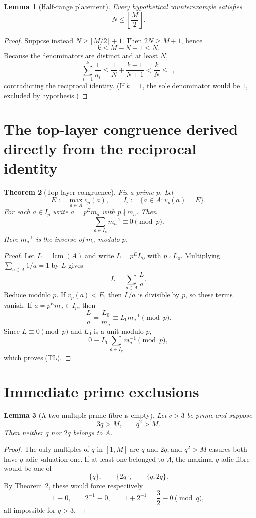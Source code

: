 \documentclass[11pt]{article}
\newtheorem{theorem}{Theorem}[section]
\newtheorem{lemma}[theorem]{Lemma}
\theoremstyle{definition}
\theoremstyle{remark}
\newcommand{\1}{\mathbf 1}
\begin{document}
\begin{lemma}[Half-range placement]\label{lem:half}
Every hypothetical counterexample satisfies
\[
 N\le \left\lfloor\frac M2\right\rfloor.
\]
\end{lemma}
\begin{proof}
Suppose instead $N\ge\lfloor M/2\rfloor+1$.  Then $2N\ge M+1$, hence
\[
 k\le M-N+1\le N.
\]
Because the denominators are distinct and at least $N$,
\[
 \sum_{i=1}^k\frac1{n_i}
 \le \frac1N+\frac{k-1}{N+1}
 < \frac{k}{N}\le1,
\]
contradicting the reciprocal identity.  (If $k=1$, the sole denominator would be $1$, excluded by hypothesis.)
\end{proof}

\section{The top-layer congruence derived directly from the reciprocal identity}

\begin{theorem}[Top-layer congruence]\label{thm:TL}
Fix a prime $p$.  Let
\[
 E:=\max_{a\in A}v_p(a),
 \qquad I_p:=\{a\in A:v_p(a)=E\}.
\]
For each $a\in I_p$ write $a=p^E m_a$ with $p\nmid m_a$.  Then
\[
 \boxed{\sum_{a\in I_p}m_a^{-1}\equiv0\pmod p.}
\tag{TL}
\]
Here $m_a^{-1}$ is the inverse of $m_a$ modulo $p$.
\end{theorem}
\begin{proof}
Let $L=\operatorname{lcm}(A)$ and write $L=p^E L_0$ with $p\nmid L_0$.  Multiplying
$\sum_{a\in A}1/a=1$ by $L$ gives
\[
 L=\sum_{a\in A}\frac La.
\]
Reduce modulo $p$.  If $v_p(a)<E$, then $L/a$ is divisible by $p$, so these terms vanish.  If
$a=p^E m_a\in I_p$, then
\[
 \frac La=\frac{L_0}{m_a}\equiv L_0m_a^{-1}\pmod p.
\]
Since $L\equiv0\pmod p$ and $L_0$ is a unit modulo $p$,
\[
 0\equiv L_0\sum_{a\in I_p}m_a^{-1}\pmod p,
\]
which proves (TL).
\end{proof}

\section{Immediate prime exclusions}

\begin{lemma}[A two-multiple prime fibre is empty]\label{lem:q2}
Let $q>3$ be prime and suppose
\[
 3q>M,\qquad q^2>M.
\]
Then neither $q$ nor $2q$ belongs to $A$.
\end{lemma}
\begin{proof}
The only multiples of $q$ in $[1,M]$ are $q$ and $2q$, and $q^2>M$ ensures both have $q$-adic valuation one.
If at least one belonged to $A$, the maximal $q$-adic fibre would be one of
\[
 \{q\},\qquad\{2q\},\qquad\{q,2q\}.
\]
By Theorem~\ref{thm:TL}, these would force respectively
\[
 1\equiv0,\qquad 2^{-1}\equiv0,\qquad1+2^{-1}=\frac32\equiv0\pmod q,
\]
all impossible for $q>3$.
\end{proof}
\end{document}
